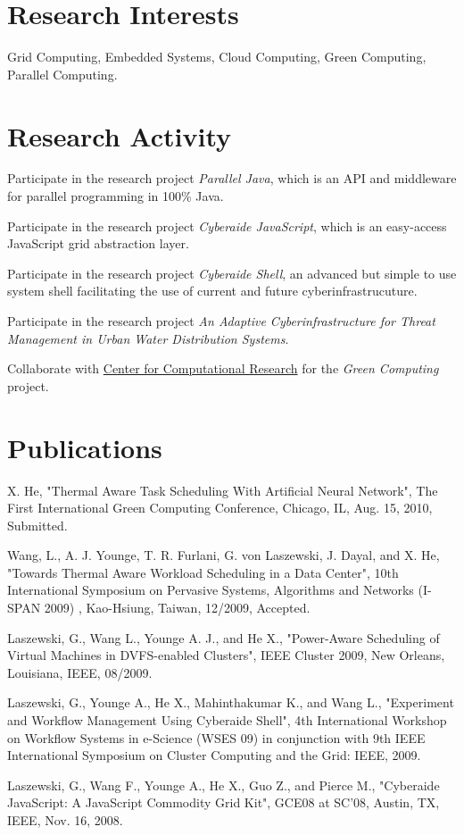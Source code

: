 \documentclass[10pt,letterpaper]{article}
\renewenvironment{itemize}{
  \begin{list}{}{
    \setlength{\leftmargin}{1.5em}
  }
}{
  \end{list}
}
\begin{document}
\section*{Research Interests}

Grid Computing,  Embedded Systems, Cloud Computing, Green Computing, Parallel Computing.

\section*{Research Activity}
\begin {itemize}
\item Participate in the research project {\em Parallel Java}, which is an API and middleware for parallel programming in 100\% Java.
\item Participate in the research project {\em Cyberaide JavaScript}, which is an easy-access JavaScript grid abstraction layer.
\item Participate in the research project {\em Cyberaide Shell}, an advanced but simple to use system shell facilitating the use of current and future cyberinfrastrucuture.
\item Participate in the research project {\em An Adaptive Cyberinfrastructure for 
Threat Management in Urban Water Distribution Systems}.
\item Collaborate with \href{http://www.ccr.buffalo.edu/display/WEB/Home} {Center for Computational Research} for the {\em Green Computing} project.
\end {itemize}


\section*{Publications}

\begin{itemize}
\item X. He, "Thermal Aware Task Scheduling With Artificial Neural Network", The First International Green Computing Conference, Chicago, IL, Aug. 15, 2010, Submitted.
\item Wang, L., A. J. Younge, T. R. Furlani, G. von Laszewski, J. Dayal, and X. He, "Towards Thermal Aware Workload Scheduling in a Data Center", 10th International Symposium on Pervasive Systems, Algorithms and Networks (I-SPAN 2009) , Kao-Hsiung, Taiwan, 12/2009, Accepted.
\item Laszewski, G., Wang L., Younge A. J., and He X.,  "Power-Aware Scheduling of Virtual Machines in DVFS-enabled Clusters",  IEEE Cluster 2009, New Orleans, Louisiana, IEEE, 08/2009.
\item Laszewski, G., Younge A., He X., Mahinthakumar K., and Wang L.,  "Experiment and Workflow Management Using Cyberaide Shell",  4th International Workshop on Workflow Systems in e-Science (WSES 09) in conjunction with 9th IEEE International Symposium on Cluster Computing and the Grid: IEEE, 2009.
\item Laszewski, G., Wang F., Younge A., He X., Guo Z., and Pierce M.,  "Cyberaide JavaScript: A JavaScript Commodity Grid Kit",  GCE08 at SC'08, Austin, TX, IEEE, Nov. 16, 2008.
\end{itemize}
\end{document}

